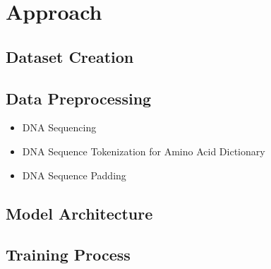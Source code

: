 \section{Approach}  \label{approach}

\subsection{Dataset Creation}  \label{ch:approachA}

\subsection{Data Preprocessing}  \label{ch:approachB}

\begin{itemize}
	\item DNA Sequencing
	\item DNA Sequence Tokenization for Amino Acid Dictionary
	\item DNA Sequence Padding
\end{itemize}

\subsection{Model Architecture}  \label{ch:approachC}

\subsection{Training Process} \label{ch:approachD}


\newpage
